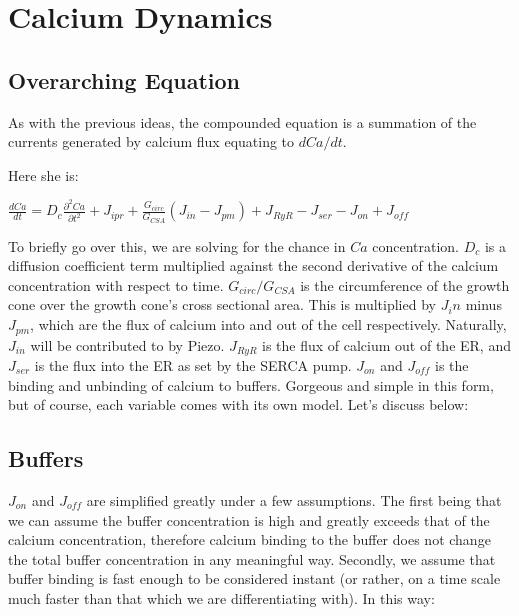 \documentclass[12pt]{amsart}
\begin{document}
\section{Calcium Dynamics}

\subsection{Overarching Equation} As with the previous ideas, the compounded equation is a summation of the currents generated by calcium flux equating to $dCa / dt$.\newline

Here she is: 

\begin{center}

    $\frac{dCa}{dt} = D_c\frac{\partial^2 Ca}{\partial t^2} + J_{ipr} + \frac{G_{circ}}{G_{CSA}}(J_{in} - J_{pm}) + J_{RyR} - J_{ser} - J_{on} + J_{off}$

\end{center}

\bigskip

To briefly go over this, we are solving for the chance in $Ca$ concentration. $D_c$ is a diffusion coefficient term multiplied against the second derivative of the calcium concentration with respect to time. $G_{circ} / G_{CSA}$ is the circumference of the growth cone over the growth cone's cross sectional area. This is multiplied by $J_in$ minus $J_{pm}$, which are the flux of calcium into and out of the cell respectively. Naturally, $J_{in}$ will be contributed to by Piezo. $J_{RyR}$ is the flux of calcium out of the ER, and $J_{ser}$ is the flux into the ER as set by the SERCA pump. $J_{on}$ and $J_{off}$ is the binding and unbinding of calcium to buffers. Gorgeous and simple in this form, but of course, each variable comes with its own model. Let's discuss below: 

\subsection{Buffers} $J_{on}$ and $J_{off}$ are simplified greatly under a few assumptions. The first being that we can assume the buffer concentration is high and greatly exceeds that of the calcium concentration, therefore calcium binding to the buffer does not change the total buffer concentration in any meaningful way. Secondly, we assume that buffer binding is fast enough to be considered instant (or rather, on a time scale much faster than that which we are differentiating with). In this way:
\end{document}

